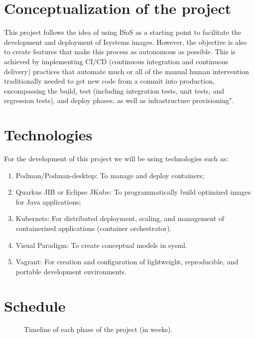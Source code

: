 \documentclass[a4paper,twoside,11pt]{article}
\begin{document}
    
\section{Conceptualization of the project}
    This project follows the idea of using ISoS as a starting point to facilitate the development and deployment of Isystems images.
    However, the objective is also to create features that make this process as autonomous as possible. This is achieved by implementing CI/CD (continuous integration and continuous delivery) practices that automate much or all of the manual human intervention traditionally needed to get new code from a commit into production, encompassing the build, test (including integration tests, unit tests, and regression tests), and deploy phases, as well as infrastructure provisioning"\cite{ci/cd}.
    
\section{Technologies}    
    
    For the development of this project we will be using technologies such as:
    
    \begin{enumerate}
        \item Podman/Podman-desktop: To manage and deploy containers\cite{podman};
        \item Quarkus JIB or Eclipse JKube: To programmatically build optimized images for Java applications\cite{quarkusjib}\cite{eclipse};
        \item Kubernets: For distributed deployment, scaling, and management of containerized applications (container orchestrator)\cite{kubernets}.
        \item Visual Paradigm: To create conceptual models in sysml.
        \item Vagrant: For creation and configuration of lightweight, reproducible, and portable development environments\cite{vagrant}.
    \end{enumerate} 
    
\section{Schedule}
    \begin{figure}[h]
    \begin{center}
    \caption{Timeline of each phase of the project (in weeks).}\label{fig:logotipo}
    \end{center}
    \end{figure}



\end{document}
